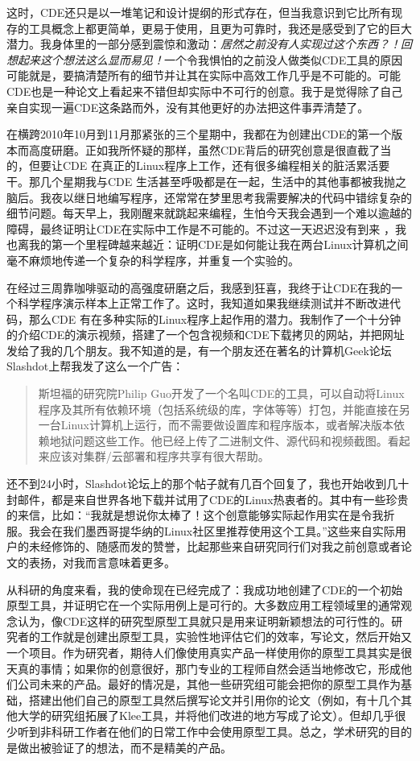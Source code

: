 \documentclass[letter,12pt]{book}
\begin{document}
\begin{CJK}{UTF8}{gbsn}
这时，CDE还只是以一堆笔记和设计提纲的形式存在，但当我意识到它比所有现存的工具概念上都更简单，更易于使用，且更为可靠时，我还是感受到了它的巨大潜力。我身体里的一部分感到震惊和激动：\emph{居然之前没有人实现过这个东西？！回想起来这个想法这么显而易见！}一个令我惧怕的之前没人做类似CDE工具的原因可能就是，要搞清楚所有的细节并让其在实际中高效工作几乎是不可能的。可能CDE也是一种论文上看起来不错但却实际中不可行的创意。我于是觉得除了自己亲自实现一遍CDE这条路而外，没有其他更好的办法把这件事弄清楚了。

在横跨2010年10月到11月那紧张的三个星期中，我都在为创建出CDE的第一个版本而高度研磨。正如我所怀疑的那样，虽然CDE背后的研究创意是很直截了当的，但要让CDE 在真正的Linux程序上工作，还有很多编程相关的脏活累活要干。那几个星期我与CDE 生活甚至呼吸都是在一起，生活中的其他事都被我抛之脑后。我夜以继日地编写程序，还常常在梦里思考我需要解决的代码中错综复杂的细节问题。每天早上，我刚醒来就跳起来编程，生怕今天我会遇到一个难以逾越的障碍，最终证明让CDE在实际中工作是不可能的。不过这一天迟迟没有到来 ，我也离我的第一个里程碑越来越近：证明CDE是如何能让我在两台Linux计算机之间毫不麻烦地传递一个复杂的科学程序，并重复一个实验的。

在经过三周靠咖啡驱动的高强度研磨之后，我感到狂喜，我终于让CDE在我的一个科学程序演示样本上正常工作了。这时，我知道如果我继续测试并不断改进代码，那么CDE 有在多种实际的Linux程序上起作用的潜力。我制作了一个十分钟的介绍CDE的演示视频，搭建了一个包含视频和CDE下载拷贝的网站，并把网址发给了我的几个朋友。我不知道的是，有一个朋友还在著名的计算机Geek论坛Slashdot上帮我发了这么一个广告：
\begin{quote}
  斯坦福的研究院Philip Guo开发了一个名叫CDE的工具，可以自动将Linux程序及其所有依赖环境（包括系统级的库，字体等等）打包，并能直接在另一台Linux计算机上运行，而不需要做设置库和程序版本，或者解决版本依赖地狱问题这些工作。他已经上传了二进制文件、源代码和视频截图。看起来应该对集群/云部署和程序共享有很大帮助。
\end{quote}
还不到24小时，Slashdot论坛上的那个帖子就有几百个回复了，我也开始收到几十封邮件，都是来自世界各地下载并试用了CDE的Linux热衷者的。其中有一些珍贵的来信，比如：“我就是想说你太棒了！这个创意能够实际起作用实在是令我折服。我会在我们墨西哥提华纳的Linux社区里推荐使用这个工具。”这些来自实际用户的未经修饰的、随感而发的赞誉，比起那些来自研究同行们对我之前创意或者论文的表扬，对我而言意味着更多。

\breakline

从科研的角度来看，我的使命现在已经完成了：我成功地创建了CDE的一个初始原型工具，并证明它在一个实际用例上是可行的。大多数应用工程领域里的通常观念认为，像CDE这样的研究型原型工具就只是用来证明新颖想法的可行性的。研究者的工作就是创建出原型工具，实验性地评估它们的效率，写论文，然后开始又一个项目。作为研究者，期待人们像使用真实产品一样使用你的原型工具其实是很天真的事情；如果你的创意很好，那门专业的工程师自然会适当地修改它，形成他们公司未来的产品。最好的情况是，其他一些研究组可能会把你的原型工具作为基础，搭建出他们自己的原型工具然后撰写论文并引用你的论文（例如，有十几个其他大学的研究组拓展了Klee工具，并将他们改进的地方写成了论文）。但却几乎很少听到非科研工作者在他们的日常工作中会使用原型工具。总之，学术研究的目的是做出被验证了的想法，而不是精美的产品。


\end{CJK}
\end{document}
